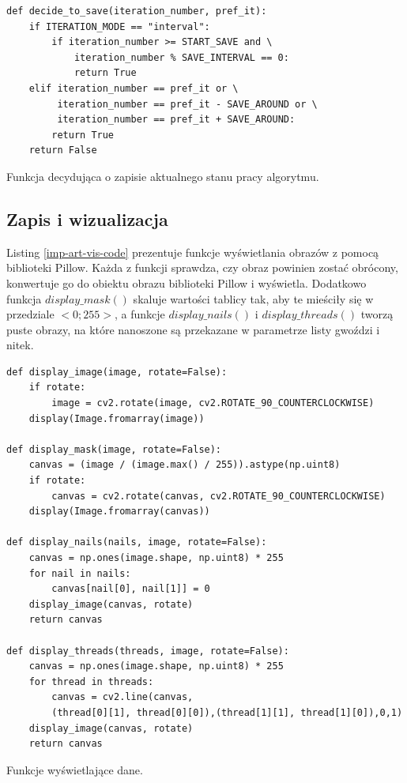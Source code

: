 \documentclass[a4paper, 12pt, polish, twoside]{extreport}
\begin{document}
        \begin{code}[H]
        \begin{verbatim}
def decide_to_save(iteration_number, pref_it):
    if ITERATION_MODE == "interval":
        if iteration_number >= START_SAVE and \
            iteration_number % SAVE_INTERVAL == 0:
            return True
    elif iteration_number == pref_it or \
         iteration_number == pref_it - SAVE_AROUND or \
         iteration_number == pref_it + SAVE_AROUND:
        return True
    return False
        \end{verbatim}
        \caption{Funkcja decydująca o zapisie aktualnego stanu pracy algorytmu.}
        \label{imp-art-decide-save-code}
        \end{code}
        
        \subsection{Zapis i wizualizacja} \label{imp-art-wiz}
        Listing \ref{imp-art-vis-code} prezentuje funkcje wyświetlania obrazów z pomocą biblioteki Pillow. Każda z funkcji sprawdza, czy obraz powinien zostać obrócony, konwertuje go do obiektu obrazu biblioteki Pillow i wyświetla. Dodatkowo funkcja \(display\_mask()\) skaluje wartości tablicy tak, aby te mieściły się w przedziale \(<0;255>\), a funkcje \(display\_nails()\) i \(display\_threads()\) tworzą puste obrazy, na które nanoszone są przekazane w parametrze listy gwoździ i nitek. 
        \begin{code}[H]
        \begin{verbatim}
def display_image(image, rotate=False):
    if rotate:
        image = cv2.rotate(image, cv2.ROTATE_90_COUNTERCLOCKWISE)
    display(Image.fromarray(image))

def display_mask(image, rotate=False):
    canvas = (image / (image.max() / 255)).astype(np.uint8)
    if rotate:
        canvas = cv2.rotate(canvas, cv2.ROTATE_90_COUNTERCLOCKWISE)
    display(Image.fromarray(canvas))

def display_nails(nails, image, rotate=False):
    canvas = np.ones(image.shape, np.uint8) * 255
    for nail in nails:
        canvas[nail[0], nail[1]] = 0
    display_image(canvas, rotate)
    return canvas

def display_threads(threads, image, rotate=False):
    canvas = np.ones(image.shape, np.uint8) * 255
    for thread in threads:
        canvas = cv2.line(canvas, 
        (thread[0][1], thread[0][0]),(thread[1][1], thread[1][0]),0,1)
    display_image(canvas, rotate)
    return canvas
        \end{verbatim}
        \caption{Funkcje wyświetlające dane.}
        \label{imp-art-vis-code}
        \end{code}
        
\end{document}
